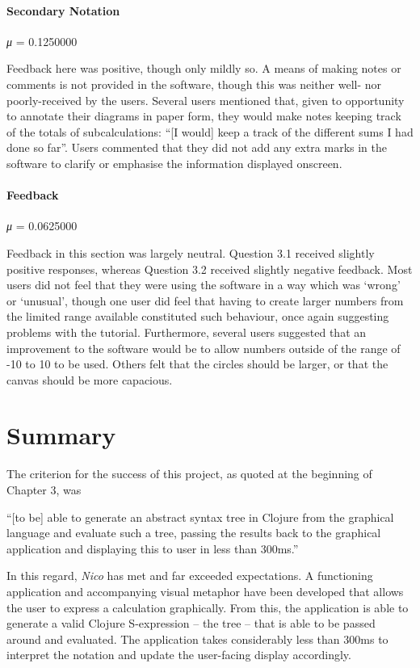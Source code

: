 \documentclass[12pt,twoside,notitlepage,xetex]{report}
\begin{document}
\paragraph{Secondary Notation}\hfill

\emph{μ} = 0.1250000

Feedback here was positive, though only mildly so.  A means of making notes or comments is not provided in the software, though this was neither well- nor poorly-received by the users.  Several users mentioned that, given to opportunity to annotate their diagrams in paper form, they would make notes keeping track of the totals of subcalculations: ``[I would] keep a track of the different sums I had done so far''.  Users commented that they did not add any extra marks in the software to clarify or emphasise the information displayed onscreen.

\paragraph{Feedback}\hfill

\emph{μ} = 0.0625000

Feedback in this section was largely neutral.  Question 3.1 received slightly positive responses, whereas Question 3.2 received slightly negative feedback.  Most users did not feel that they were using the software in a way which was `wrong' or `unusual', though one user did feel that having to create larger numbers from the limited range available constituted such behaviour, once again suggesting problems with the tutorial.  Furthermore, several users suggested that an improvement to the software would be to allow numbers outside of the range of -10 to 10 to be used.  Others felt that the circles should be larger, or that the canvas should be more capacious.

\section{Summary}
The criterion for the success of this project, as quoted at the beginning of Chapter 3, was
\begin{center}
\parbox[c]{\textwidth-2cm}{
\small
``[to be] able to generate an abstract syntax tree in Clojure from the graphical language and evaluate such a tree, passing the results back to the graphical application and displaying this to user in less than 300ms.''
}
\end{center}
In this regard, \emph{Nico} has met and far exceeded expectations.  A functioning application and accompanying visual metaphor have been developed that allows the user to express a calculation graphically.  From this, the application is able to generate a valid Clojure S-expression -- the tree -- that is able to be passed around and evaluated.  The application takes considerably less than 300ms to interpret the notation and update the user-facing display accordingly.
\end{document}
